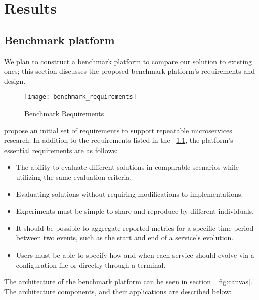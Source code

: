 
%

\chapter{Results}
\label{cha:results}

\section{Benchmark platform} %
\label{sec:benchmark_platform}

We plan to construct a benchmark platform to compare our solution to existing ones; this section discusses the proposed benchmark platform's requirements and design.

\begin{figure}[htbp]
    \centering
    \texttt{[image: benchmark\_requirements]}
    \caption{Benchmark Requirements \cite{microservices2017benchmark}}
    \label{fig:benchmark}
\end{figure}

\citeauthor{microservices2017benchmark} propose an initial set of requirements
to support repeatable microservices research.
In addition to the requirements listed in the ~\ref{fig:benchmark}, the platform's essential requirements are as follows:
\begin{itemize}
    \item The ability to evaluate different solutions in comparable scenarios while utilizing the same evaluation criteria.
    \item Evaluating solutions without requiring modifications to implementations.
    \item Experiments must be simple to share and reproduce by different individuals.
    \item It should be possible to aggregate reported metrics for a specific time period between two events, such as the start and end of a service's evolution.
    \item Users must be able to specify how and when each service should evolve via a configuration file or directly through a terminal.
\end{itemize}

The architecture of the benchmark platform can be seen in section ~\ref{fig:canvas}.
The architecture components, and their applications are described below:

